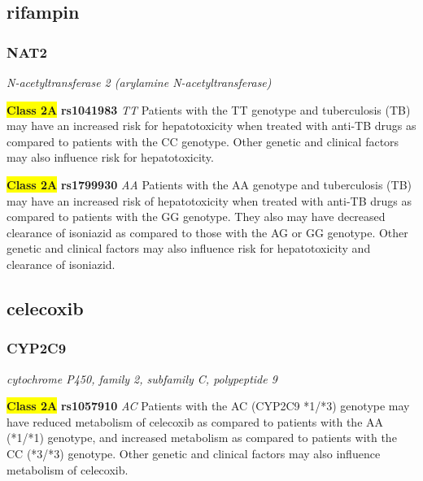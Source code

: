 \documentclass{report}
\begin{document}
\subsection{ rifampin }\subsubsection{ NAT2 }
\textit{ N-acetyltransferase 2 (arylamine N-acetyltransferase) } \newline




\textbf{\colorbox{yellow} {Class 2A}} \textbf{ rs1041983 } \textit{ TT }
Patients with the TT genotype and tuberculosis (TB) may have an increased risk for hepatotoxicity when treated with anti-TB drugs as compared to patients with the CC genotype. Other genetic and clinical factors may also influence risk for hepatotoxicity.\newline

\textbf{\colorbox{yellow} {Class 2A}} \textbf{ rs1799930 } \textit{ AA }
Patients with the AA genotype and tuberculosis (TB) may have an increased risk of hepatotoxicity when treated with anti-TB drugs as compared to patients with the GG genotype. They also may have decreased clearance of isoniazid as compared to those with the AG or GG genotype. Other genetic and clinical factors may also influence risk for hepatotoxicity and clearance of isoniazid.\newline



\subsection{ celecoxib }\subsubsection{ CYP2C9 }
\textit{ cytochrome P450, family 2, subfamily C, polypeptide 9 } \newline




\textbf{\colorbox{yellow} {Class 2A}} \textbf{ rs1057910 } \textit{ AC }
Patients with the AC (CYP2C9 *1/*3) genotype may have reduced metabolism of celecoxib as compared to patients with the AA (*1/*1) genotype, and increased metabolism as compared to patients with the CC (*3/*3) genotype. Other genetic and clinical factors may also influence metabolism of celecoxib. \newline
\end{document}
